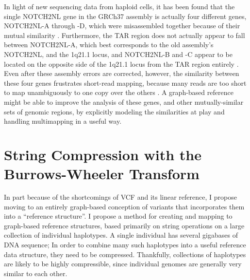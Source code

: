 \documentclass[11pt,proposal]{ucthesis}
\begin{document}
In light of new sequencing data from haploid cells, it has been found that the single NOTCH2NL gene in the GRCh37 assembly is actually four different genes, NOTCH2NL-A through -D, which were misassembled together because of their mutual similarity \cite{jacobs2014recently}. Furthermore, the TAR region does not actually appear to fall between NOTCH2NL-A, which best corresponds to the old assembly's NOTCH2NL, and the 1q21.1 locus, and NOTCH2NL-B and -C appear to be located on the opposite side of the 1q21.1 locus from the TAR region entirely \cite{jacobs2014recently}. Even after these assembly errors are corrected, however, the similarity between these four genes frustrates short-read mapping, because many reads are too short to map unambiguously to one copy over the others \cite{jacobs2014recently}. A graph-based reference might be able to improve the analysis of these genes, and other mutually-similar sets of genomic regions, by explicitly modeling the similarities at play and handling multimapping in a useful way.
    
    
    
    
    
    

\section{String Compression with the Burrows-Wheeler Transform}
\label{sec:bwt}

In part because of the shortcomings of VCF and its linear reference, I propose moving to an entirely graph-based conception of variants that incorporates them into a ``reference structure''. I propose a method for creating and mapping to graph-based reference structures, based primarily on string operations on a large collection of individual haplotypes. A single individual has several gigabases of DNA sequence; In order to combine many such haplotypes into a useful reference data structure, they need to be compressed. Thankfully, collections of haplotypes are likely to be highly compressible, since individual genomes are generally very similar to each other.
\end{document}
